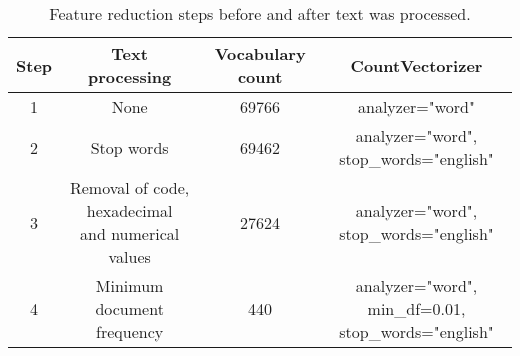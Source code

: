 \begin{table}[h]%
	\centering
	\begin{tabular}{| c | c | c | c |}
		\hline
		Step & Text processing  & Vocabulary count & CountVectorizer  \\ \hline
		1 	& None 									& 69766 	& analyzer="word" \\ \hline
		2 	& Stop words 							& 69462 	& 
			\shortstack{analyzer="word", \\ stop\_words="english"} \\ \hline
		3 	& \shortstack{Removal of code, 
			hexadecimal \\ and numerical values} 	& 27624 	& 
			\shortstack{analyzer="word", \\ stop\_words="english"} \\ \hline
		4 	& Minimum document frequency 			& 440 		& 
				\shortstack{analyzer="word", min\_df=0.01, \\ stop\_words="english"} \\ \hline
	\end{tabular}
	\caption{Feature reduction steps before and after text was processed.}
	\label{tab:feature_reduction}
\end{table}


